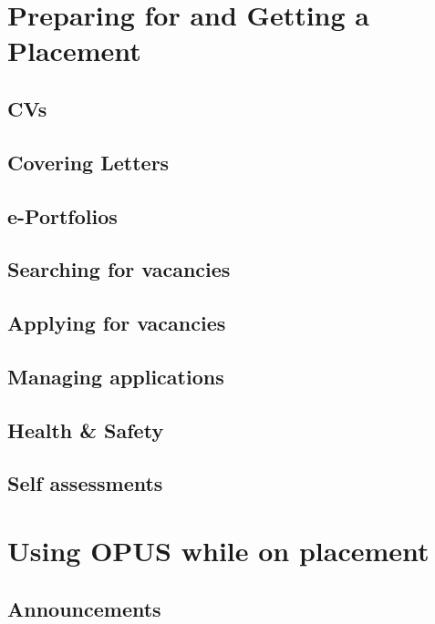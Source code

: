 \documentclass[12 pt]{book}
\begin{document}
%
%
%

\chapter{Preparing for and Getting a Placement}

\section{CVs}

\section{Covering Letters}

\section{e-Portfolios}

\section{Searching for vacancies}

\section{Applying for vacancies}

\section{Managing applications}

\section{Health \& Safety}

\section{Self assessments}

%
%
%


\chapter{Using OPUS while on placement}

\section{Announcements}
\end{document}
